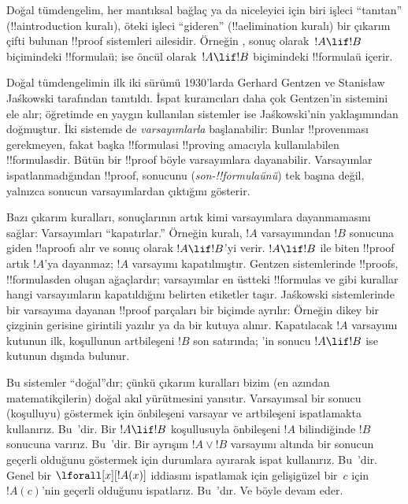 \documentclass[../../../include/open-logic-section]{subfiles}
\begin{document}


Doğal tümdengelim, her mantıksal bağlaç ya da niceleyici için biri işleci
``tanıtan'' (!!a{introduction} kuralı), öteki işleci ``gideren''
(!!a{elimination} kuralı) bir çıkarım çifti bulunan !!{proof} sistemleri
ailesidir. Örneğin \Intro{\lif}, sonuç olarak~$!A \lif !B$ biçimindeki
!!{formula}{}ü; \Elim{\lif} ise öncül olarak~$!A \lif !B$ biçimindeki
!!{formula}{}ü içerir.

Doğal tümdengelimin ilk iki sürümü 1930'larda Gerhard Gentzen ve Stanisław
Jaśkowski tarafından tanıtıldı. İspat kuramcıları daha çok Gentzen'in
sistemini ele alır; öğretimde en yaygın kullanılan sistemler ise
Jaśkowski'nin yaklaşımından doğmuştur. İki sistemde de \emph{varsayımlarla}
başlanabilir: Bunlar !!{prove}{}nması gerekmeyen, fakat başka !!{formula}s{}i
!!{proving} amacıyla kullanılabilen !!{formula}s{}dir. Bütün bir !!{proof} böyle
varsayımlara dayanabilir. Varsayımlar ispatlanmadığından !!{proof}, sonucunu
(\emph{son-!!{formula}{}ünü}) tek başına değil, yalnızca sonucun varsayımlardan
çıktığını gösterir.

Bazı çıkarım kuralları, sonuçlarının artık kimi varsayımlara dayanmamasını
sağlar: Varsayımları ``kapatırlar.'' Örneğin \Intro{\lif} kuralı, $!A$
varsayımından $!B$ sonucuna giden !!a{proof}{}ı alır ve sonuç olarak
$!A \lif !B$'yi verir. $!A \lif !B$ ile biten !!{proof} artık $!A$'ya
dayanmaz; $!A$ varsayımı kapatılmıştır. Gentzen sistemlerinde !!{proof}s,
!!{formula}s{}den oluşan ağaçlardır; varsayımlar en üstteki !!{formula}s ve
\Intro{\lif} gibi kurallar hangi varsayımların kapatıldığını belirten
etiketler taşır. Jaśkowski sistemlerinde bir varsayıma dayanan !!{proof}
parçaları bir biçimde ayrılır: Örneğin dikey bir çizginin gerisine girintili
yazılır ya da bir kutuya alınır. Kapatılacak $!A$ varsayımı kutunun ilk,
koşullunun artbileşeni $!B$ son satırında; \Intro{\lif}'in sonucu
$!A \lif !B$ ise kutunun dışında bulunur.

Bu sistemler ``doğal''dır; çünkü çıkarım kuralları bizim (en azından
matematikçilerin) doğal akıl yürütmesini yansıtır. Varsayımsal bir sonucu
(koşulluyu) göstermek için önbileşeni varsayar ve artbileşeni ispatlamakta
kullanırız. Bu~\Intro{\lif}'dir. Bir $!A \lif !B$ koşullusuyla önbileşeni
$!A$ bilindiğinde $!B$ sonucuna varırız. Bu~\Elim{\lif}'dir. Bir ayrışım
$!A \lor !B$ varsayımı altında bir sonucun geçerli olduğunu göstermek için
durumlara ayırarak ispat kullanırız. Bu~\Elim{\lor}'dir. Genel bir
$\lforall[x][!A(x)]$ iddiasını ispatlamak için gelişigüzel bir~$c$ için
$!A(c)$'nin geçerli olduğunu ispatlarız. Bu~\Intro{\lforall}'dır. Ve böyle
devam eder.
\end{document}
